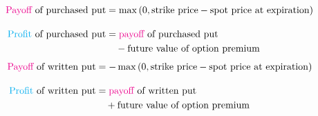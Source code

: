 \begin{frame}[fragile,t]
	\begin{align*}
		\text{\textcolor{magenta}{Payoff} of purchased put} & = \max \left( 0,  \text{strike price} - \text{spot price at expiration}\right) \\[1em]
		\text{\textcolor{cyan}{Profit} of purchased put}    & = \text{\textcolor{magenta}{payoff} of purchased put}                          \\
                                                        & \quad -\text{future value of option premium}
	\end{align*}
	\bigskip
	\mySeparateLine
	\bigskip
	\begin{align*}
		\text{\textcolor{magenta}{Payoff} of written put} & = - \max \left( 0,  \text{strike price} - \text{spot price at expiration} \right) \\[1em]
		\text{\textcolor{cyan}{Profit} of written put}    & = \text{\textcolor{magenta}{payoff} of written put}                               \\
                                                      & \quad + \text{future value of option premium}
	\end{align*}
\end{frame}
